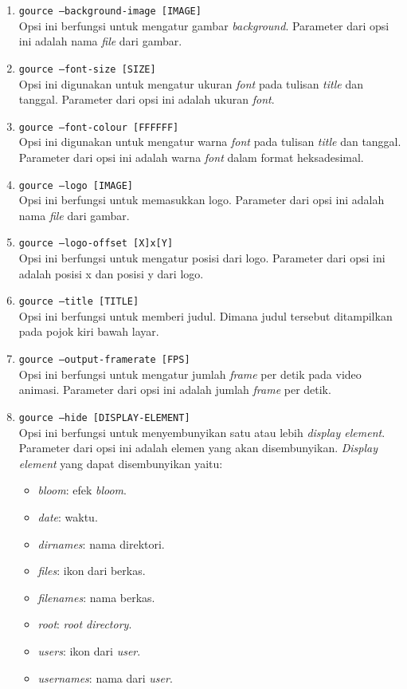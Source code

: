 \documentclass[a4paper,twoside]{article}
\begin{document}
\begin{enumerate}
\begin{enumerate}
\item \texttt{gource --background-image [IMAGE]}\\
Opsi ini berfungsi untuk mengatur gambar \textit{background}. Parameter dari opsi ini adalah nama \textit{file} dari gambar.

\item \texttt{gource --font-size [SIZE]}\\
Opsi ini digunakan untuk mengatur ukuran \textit{font} pada tulisan \textit{title} dan tanggal. Parameter dari opsi ini adalah ukuran \textit{font}.  

\item \texttt{gource --font-colour [FFFFFF]}\\
Opsi ini digunakan untuk mengatur warna \textit{font} pada tulisan \textit{title} dan tanggal. Parameter dari opsi ini adalah warna \textit{font} dalam format heksadesimal.

\item \texttt{gource --logo [IMAGE]}\\
Opsi ini berfungsi untuk memasukkan logo. Parameter dari opsi ini adalah nama \textit{file} dari gambar.

\item \texttt{gource --logo-offset [X]x[Y]}\\
Opsi ini berfungsi untuk mengatur posisi dari logo. Parameter dari opsi ini adalah posisi x dan posisi y dari logo. 

\item \texttt{gource --title [TITLE]}\\
Opsi ini berfungsi untuk memberi judul. Dimana judul tersebut ditampilkan pada pojok kiri bawah layar. 

\item \texttt{gource --output-framerate [FPS]}\\
Opsi ini berfungsi untuk mengatur jumlah \textit{frame} per detik pada video animasi. Parameter dari opsi ini adalah jumlah \textit{frame} per detik.

\item \texttt{gource --hide [DISPLAY-ELEMENT]}\\
Opsi ini berfungsi untuk menyembunyikan satu atau lebih \textit{display element}. Parameter dari opsi ini adalah elemen yang akan disembunyikan. \textit{Display element} yang dapat disembunyikan yaitu:
\begin{itemize}
\item \textit{bloom}: efek \textit{bloom}. 
\item \textit{date}: waktu.  
\item \textit{dirnames}: nama direktori. 
\item \textit{files}: ikon dari berkas. 
\item \textit{filenames}: nama berkas. 
\item \textit{root}: \textit{root directory}.
\item \textit{users}: ikon dari \textit{user}.
\item \textit{usernames}: nama dari \textit{user}.
\end{itemize}


\end{enumerate}
\end{enumerate}
\end{document}

